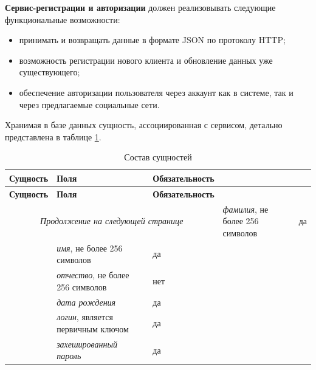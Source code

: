 \textbf{Сервис-регистрации и авторизации} должен реализовывать следующие функциональные возможности:
\begin{itemize}
	\item принимать и возвращать данные в формате JSON по протоколу HTTP;
	
	\item возможность регистрации нового клиента и обновление данных уже существующего;
	
	\item обеспечение авторизации пользователя через аккаунт как в системе, так и через предлагаемые социальные сети.
\end{itemize}
%
Хранимая в базе данных сущность, ассоциированная с сервисом, детально представлена в таблице \ref{tbl:db_auth}.
\begin{longtable}{| p{4cm} | p{8.3cm} | p{3.6cm} |}
	\caption{Состав сущностей}
	\label{tbl:db_auth} \\
	\hline
	
	\textbf{Сущность} & \textbf{Поля} & \textbf{Обязательность} \\
	\hline
	\endfirsthead
	
	\hline
	\textbf{Сущность} & \textbf{Поля} & \textbf{Обязательность} \\
	\hline
	\endhead
	
	\hline
	\multicolumn{3}{c}{\textit{Продолжение на следующей странице}}
	\endfoot
	\hline
	\endlastfoot
	
	\multirow{5}{*}{Аккаунт}
	& 
	\textit{фамилия}, не более 256 символов
	& 
	да \\
	\cline{2-3}
	
	& 
	\textit{имя}, не более 256 символов
	& 
	да \\
	\cline{2-3}
	
	& 
	\textit{отчество}, не более 256 символов
	& 
	нет \\
	\cline{2-3}
	
	& 
	\textit{дата рождения}
	& 
	да \\
	\cline{2-3}
	
	& 
	\textit{логин}, является первичным ключом
	& 
	да \\
	\cline{2-3}
	
	&
	\textit{захешированный пароль}
	&
	да \\
\end{longtable}

